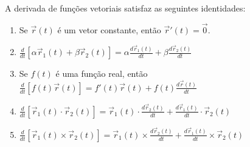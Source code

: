 \begin{teo} A derivada de funções vetoriais satisfaz as seguintes identidades:
\begin{enumerate}
\item Se $\vec{r}(t)$ é um vetor constante, então $\vec{r}'(t)=\vec{0}$. 
\item $\frac{d}{dt}\left[\alpha \vec{r}_1(t)+\beta \vec{r}_2(t)\right]=\alpha\frac{d\vec{r}_1(t)}{dt}+\beta\frac{d\vec{r}_2(t)}{dt}$
\item Se $f(t)$ é uma função real, então $\frac{d}{dt}\left[f(t) \vec{r}(t)\right]=f'(t)\vec{r}(t)+f(t)\frac{d\vec{r}(t)}{dt}$
\item $\frac{d}{dt}\left[\vec{r}_1(t)\cdot \vec{r}_2(t)\right]=\vec{r}_1(t)\cdot\frac{d\vec{r}_2(t)}{dt}+\frac{d\vec{r}_1(t)}{dt}\cdot\vec{r}_2(t)$
\item $\frac{d}{dt}\left[\vec{r}_1(t)\times \vec{r}_2(t)\right]=\vec{r}_1(t)\times\frac{d\vec{r}_2(t)}{dt}+\frac{d\vec{r}_1(t)}{dt}\times\vec{r}_2(t)$
\end{enumerate}
\end{teo}
